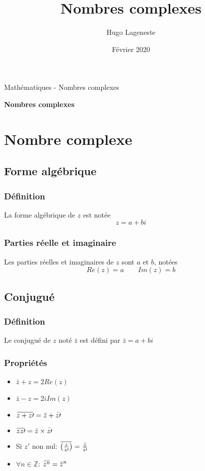 \documentclass[a4paper]{article}
\title{Nombres complexes}
\author{Hugo Lageneste}
\date{Février 2020}
\newcommand{\overbar}[1]{\mkern 1.5mu\overline{\mkern-1.5mu#1\mkern-1.5mu}\mkern 1.5mu}
\begin{document}
{Mathématiques - Nombres complexes}

\begin{center}
 \newcommand{\HRule}{\rule{\linewidth}{0.5mm}}
 {\huge \bfseries Nombres complexes}\\[0.1cm]
\end{center}

\section{Nombre complexe}
\subsection{Forme algébrique}
\subsubsection{Définition}
{La forme algébrique de $z$ est notée}
\[z=a+bi\]

\subsubsection{Parties réelle et imaginaire}
{Les parties réelles et imaginaires de $z$ sont $a$ et $b$, notées}
\[Re(z)=a \quad\quad Im(z)=b\]

\subsection{Conjugué}
\subsubsection{Définition}
{Le conjugué de $z$ noté $\bar{z}$ est défini par $\bar{z}=a+bi$}

\subsubsection{Propriétés}
\begin{multicols}{3}
	\begin{itemize}
  		\item{$\bar{z} + z = 2Re(z)$}
  		\item{$\bar{z} - z = 2iIm(z)$}
  		\item{$\overbar{z + z\prime} = \bar{z} + \bar{z\prime}$}
  		\item{$\overbar{zz\prime} = \bar{z} \times \bar{z\prime}$}
  		\item{Si $z\prime$ non nul: $\overbar{\left(\frac{z}{z\prime}\right)} = \frac{\bar{z}}{\bar{z\prime}}$}
  		\item{$\forall n \in \mathbb{Z}$: $\overbar{z^n}=\overbar{z}^n$}
	\end{itemize}
\end{multicols}
\end{document}
